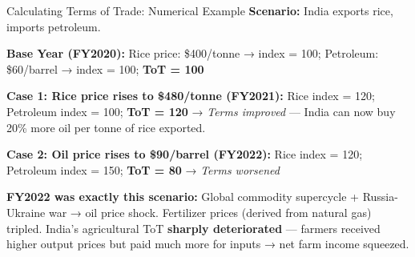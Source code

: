\documentclass[
  ignorenonframetext,
  aspectratio=169,
]{beamer}
\makeatletter
\let\quarto@originallabel\label
\DeclareRobustCommand*{\label}[1]{\quarto@originallabel{#1}}
\makeatother
\begin{document}
\begin{frame}{Calculating Terms of Trade: Numerical Example}
\label{calculating-terms-of-trade-numerical-example}
\textbf{Scenario:} India exports rice, imports petroleum.

\textbf{Base Year (FY2020):} Rice price: \$400/tonne → index = 100;
Petroleum: \$60/barrel → index = 100; \textbf{ToT = 100}

\textbf{Case 1: Rice price rises to \$480/tonne (FY2021):} Rice index =
120; Petroleum index = 100; \textbf{ToT = 120} → \emph{Terms improved}
--- India can now buy 20\% more oil per tonne of rice exported.

\textbf{Case 2: Oil price rises to \$90/barrel (FY2022):} Rice index =
120; Petroleum index = 150; \textbf{ToT = 80} → \emph{Terms worsened}

\textbf{FY2022 was exactly this scenario:} Global commodity supercycle +
Russia-Ukraine war → oil price shock. Fertilizer prices (derived from
natural gas) tripled. India's agricultural ToT \textbf{sharply
deteriorated} --- farmers received higher output prices but paid much
more for inputs → net farm income squeezed.
\end{frame}
\end{document}
